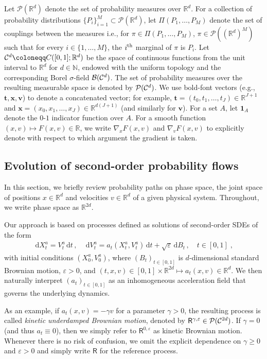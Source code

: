 \documentclass[12pt]{article}
\theoremstyle{plain}
\theoremstyle{plain}
\theoremstyle{remark}
\newcommand{\R}{\mathbb{R}}
\newcommand{\cP}{\mathcal{P}}
\newcommand{\dd}{\,\mathrm{d}}
\newcommand*{\defeq}{\coloneqq}
\newcommand{\msf}[1]{\mathsf{#1}}
\newcommand{\eps}{\varepsilon}
\newcommand{\rset}{\mathbb{R}}
\def\eqsp{\;}
\def\rset{\mathbb{R}}
\def\eqsp{\;}
\newcommand{\ccint}[1]{\left[#1\right]}
\newcommand{\1}{\bm{1}}
\theoremstyle{plain}
\theoremstyle{definition}
\theoremstyle{remark}
\begin{document}
\label{sec:notation}
Let $\cP(\R^d)$ denote the set of probability measures over $\R^d$. For a collection of probability distributions $\{P_i\}_{i=1}^M \subset \cP(\R^d)$, let $\Pi(P_1,\ldots,P_M)$ denote the set of couplings between the measures i.e., for $\pi \in \Pi(P_1,\ldots,P_M)$, $\pi \in \cP((\R^{d})^M)$ such that for every $i \in \{1,\ldots,M\}$, the $i^{\rm th}$ marginal of $\pi$ is $P_i$.
Let ${\cal C}^d \defeq C([0,1];\R^{d})$ be the space of continuous functions from the unit interval to $\R^{d}$ for $d \in \mathbb{N}$, endowed with the uniform topology and the corresponding Borel $\sigma$-field $\mathcal{B}({\cal C}^d)$. The set of probability measures over the resulting measurable space is denoted by $\mathcal{P}({\cal C}^d)$.
We use bold-font vectors (e.g., $\bm{t},\bm{x},\bm{v}$) to denote a concatenated vector; for example, $\bm{t} = (t_0,t_1,\ldots,t_J) \in \R^{J+1}$ and $\bm{x} = (x_0,x_1,\ldots,x_J) \in \R^{d(J+1)}$ (and similarly for $\bm v$).
For a set $A$, let $\bm{1}_A$ denote the $0$-$1$ indicator function over $A$.
For a smooth function $(x,v)\mapsto F(x,v)\in \R$, we write $\nabla_x F(x,v)$ and $\nabla_v F(x,v)$ to explicitly denote with respect to which argument the gradient is taken.





\subsection{Evolution of second-order probability flows}\label{sec:phasespace}
In this section, we briefly review probability paths on phase space, the joint space of positions $x\in\R^d$ and velocities $v \in \R^d$ of a given physical system. Throughout, we write phase space as $\rset^{2d}$.

Our approach is based on processes defined as solutions of second-order SDEs of the form
\begin{align}\label{eq:fp_dyn}
    \dd X_t^a = V_t^a \dd t\,, \quad \dd V_t^a = a_t(X_t^a,V_t^a)\dd t + \sqrt{\eps} \dd B_t\,, \quad t \in\ccint{0,1} \eqsp,
\end{align}
with initial conditions $(X_0^a,V_0^a)$,
where $(B_t)_{t \in [0,1]}$ is {$d$-dimensional} standard Brownian motion, $\eps > 0$, and $(t,x,v) \in \ccint{0,1}  \times \rset^{2d} \mapsto a_t(x,v) \in \R^d$. We then naturally interpret $(a_t)_{t\in[0,1]}$ as an inhomogeneous acceleration field that governs the underlying dynamics.


As an example, if $a_t(x,v) = - \gamma v$ for a parameter $\gamma > 0$, the resulting process is called \emph{kinetic underdamped Brownian motion}, denoted by $\msf R^{\gamma,\eps} \in \mathcal{P}({\cal C}^{2d})$. If $\gamma = 0$ (and thus $a_t \equiv 0$), then we simply refer to $\msf R^{0,\eps}$ as kinetic Brownian motion. Whenever there is no risk of confusion, we omit the explicit dependence on $\gamma \geq 0$ and $\eps > 0$ and simply write $\msf R$ for the reference process.
\end{document}
